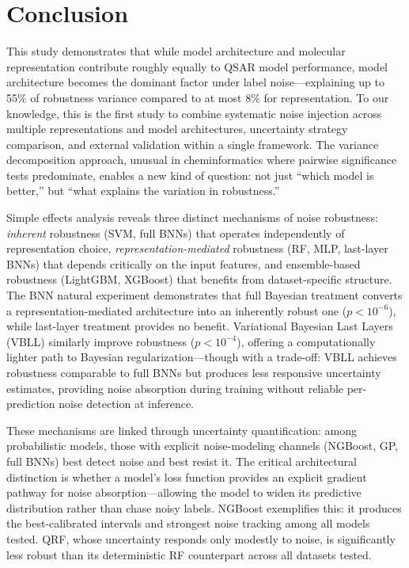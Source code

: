 \documentclass[pdflatex,sn-mathphys-num]{sn-jnl}%
\theoremstyle{thmstyleone}%
\theoremstyle{thmstyletwo}%
\theoremstyle{thmstylethree}%
\begin{document}
\section{Conclusion}\label{sec13}
This study demonstrates that while model architecture and molecular representation contribute roughly equally to QSAR model performance, model architecture becomes the dominant factor under label noise---explaining up to 55\% of robustness variance compared to at most 8\% for representation. To our knowledge, this is the first study to combine systematic noise injection across multiple representations and model architectures, uncertainty strategy comparison, and external validation within a single framework. The variance decomposition approach, unusual in cheminformatics where pairwise significance tests predominate, enables a new kind of question: not just ``which model is better,'' but ``what explains the variation in robustness.''

Simple effects analysis reveals three distinct mechanisms of noise robustness: \emph{inherent} robustness (SVM, full BNNs) that operates independently of representation choice, \emph{representation-mediated} robustness (RF, MLP, last-layer BNNs) that depends critically on the input features, and ensemble-based robustness (LightGBM, XGBoost) that benefits from dataset-specific structure. The BNN natural experiment demonstrates that full Bayesian treatment converts a representation-mediated architecture into an inherently robust one ($p < 10^{-6}$), while last-layer treatment provides no benefit. Variational Bayesian Last Layers (VBLL) similarly improve robustness ($p < 10^{-4}$), offering a computationally lighter path to Bayesian regularization---though with a trade-off: VBLL achieves robustness comparable to full BNNs but produces less responsive uncertainty estimates, providing noise absorption during training without reliable per-prediction noise detection at inference.

These mechanisms are linked through uncertainty quantification: among probabilistic models, those with explicit noise-modeling channels (NGBoost, GP, full BNNs) best detect noise and best resist it. The critical architectural distinction is whether a model's loss function provides an explicit gradient pathway for noise absorption---allowing the model to widen its predictive distribution rather than chase noisy labels. NGBoost exemplifies this: it produces the best-calibrated intervals and strongest noise tracking among all models tested. QRF, whose uncertainty responds only modestly to noise, is significantly less robust than its deterministic RF counterpart across all datasets tested.
\end{document}
